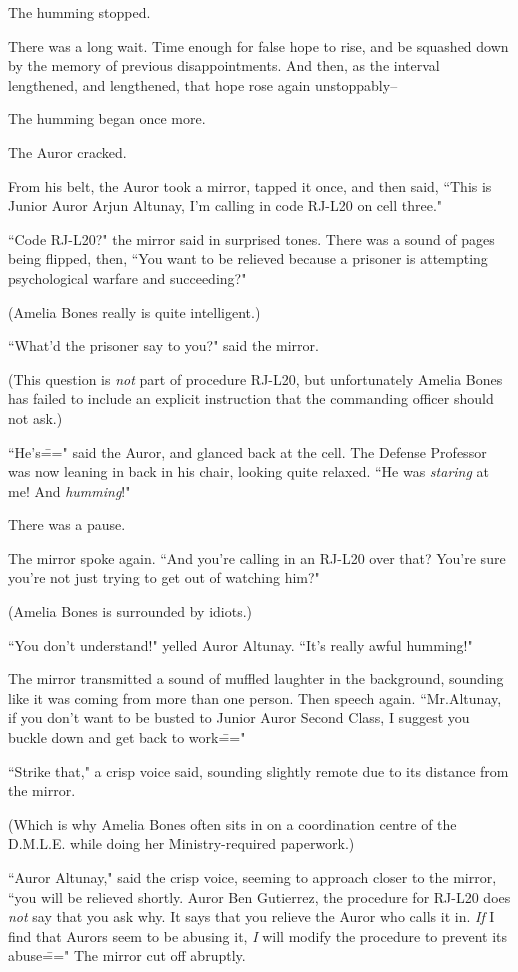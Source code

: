 The humming stopped.

There was a long wait. Time enough for false hope to rise, and be squashed down by the memory of previous disappointments. And then, as the interval lengthened, and lengthened, that hope rose again unstoppably\---

The humming began once more.

The Auror cracked.

From his belt, the Auror took a mirror, tapped it once, and then said, ``This is Junior Auror Arjun Altunay, I'm calling in code RJ-L20 on cell three."

``Code RJ-L20?" the mirror said in surprised tones. There was a sound of pages being flipped, then, ``You want to be relieved because a prisoner is attempting psychological warfare and succeeding?"

(Amelia Bones really is quite intelligent.)

``What'd the prisoner say to you?" said the mirror.

(This question is \emph{not} part of procedure RJ-L20, but unfortunately Amelia Bones has failed to include an explicit instruction that the commanding officer should not ask.)

``He's\===" said the Auror, and glanced back at the cell. The Defense Professor was now leaning in back in his chair, looking quite relaxed. ``He was \emph{staring} at me! And \emph{humming}!"

There was a pause.

The mirror spoke again. ``And you're calling in an RJ-L20 over that? You're sure you're not just trying to get out of watching him?"

(Amelia Bones is surrounded by idiots.)

``You don't understand!" yelled Auror Altunay. ``It's really awful humming!"

The mirror transmitted a sound of muffled laughter in the background, sounding like it was coming from more than one person. Then speech again. ``Mr.\?Altunay, if you don't want to be busted to Junior Auror Second Class, I suggest you buckle down and get back to work\==="

``Strike that," a crisp voice said, sounding slightly remote due to its distance from the mirror.

(Which is why Amelia Bones often sits in on a coordination centre of the D.M.L.E. while doing her Ministry-required paperwork.)

``Auror Altunay," said the crisp voice, seeming to approach closer to the mirror, ``you will be relieved shortly. Auror Ben Gutierrez, the procedure for RJ-L20 does \emph{not} say that you ask why. It says that you relieve the Auror who calls it in. \emph{If} I find that Aurors seem to be abusing it, \emph{I} will modify the procedure to prevent its abuse\===" The mirror cut off abruptly.


